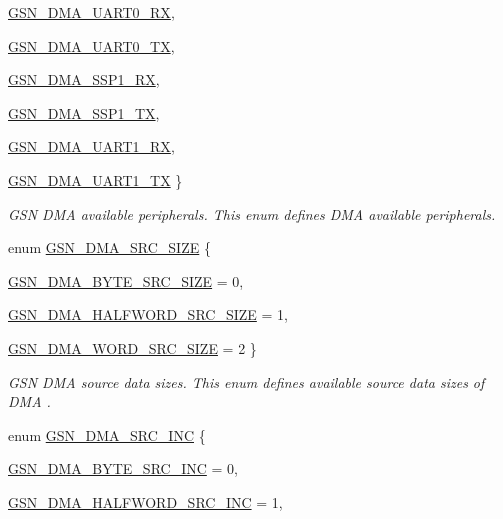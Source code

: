 \begin{DoxyCompactItemize}
\hyperlink{a00645_gga6b06d19717ade6dfd815a84e83d2388ca468b318f813ebdf54dbdf450f16a5732}{GSN\_\-DMA\_\-UART0\_\-RX}, 
\par
\hyperlink{a00645_gga6b06d19717ade6dfd815a84e83d2388caa4f202e8206de2d1ebfad1ad912bcd8d}{GSN\_\-DMA\_\-UART0\_\-TX}, 
\par
\hyperlink{a00645_gga6b06d19717ade6dfd815a84e83d2388ca328799f2ecf2b7883c1d7e4fce9664b7}{GSN\_\-DMA\_\-SSP1\_\-RX}, 
\par
\hyperlink{a00645_gga6b06d19717ade6dfd815a84e83d2388ca4f93148490d2139f20dfd6d88405f15d}{GSN\_\-DMA\_\-SSP1\_\-TX}, 
\par
\hyperlink{a00645_gga6b06d19717ade6dfd815a84e83d2388ca3066765ac1cd87c8ef4d029be6e620e6}{GSN\_\-DMA\_\-UART1\_\-RX}, 
\par
\hyperlink{a00645_gga6b06d19717ade6dfd815a84e83d2388ca9a3ace920959df147a2c3d35dcaa3013}{GSN\_\-DMA\_\-UART1\_\-TX}
 \}
\begin{DoxyCompactList}\small\item\em GSN DMA available peripherals. This enum defines DMA available peripherals. \end{DoxyCompactList}\item 
enum \hyperlink{a00645_ga5ae8eaac9f901eb2607d04c46b8141e9}{GSN\_\-DMA\_\-SRC\_\-SIZE} \{ \par
\hyperlink{a00645_gga5ae8eaac9f901eb2607d04c46b8141e9a2b2932e85c3b4fc18d56c38f39d31dd8}{GSN\_\-DMA\_\-BYTE\_\-SRC\_\-SIZE} =  0, 
\par
\hyperlink{a00645_gga5ae8eaac9f901eb2607d04c46b8141e9acb13c0f2739cfa4759bb75be01f0c5d6}{GSN\_\-DMA\_\-HALFWORD\_\-SRC\_\-SIZE} =  1, 
\par
\hyperlink{a00645_gga5ae8eaac9f901eb2607d04c46b8141e9a881ac284185eaa1f1eb431452ce9bbe5}{GSN\_\-DMA\_\-WORD\_\-SRC\_\-SIZE} =  2
 \}
\begin{DoxyCompactList}\small\item\em GSN DMA source data sizes. This enum defines available source data sizes of DMA . \end{DoxyCompactList}\item 
enum \hyperlink{a00645_ga592093c11bfd36ebbe08e1446e26f37a}{GSN\_\-DMA\_\-SRC\_\-INC} \{ \par
\hyperlink{a00645_gga592093c11bfd36ebbe08e1446e26f37aa33e61f45484d1c2ae0d2c8ad6a520b0b}{GSN\_\-DMA\_\-BYTE\_\-SRC\_\-INC} =  0, 
\par
\hyperlink{a00645_gga592093c11bfd36ebbe08e1446e26f37aa0fb26d608d6f3abb56aa50dc5e3588ab}{GSN\_\-DMA\_\-HALFWORD\_\-SRC\_\-INC} =  1, 
\par

\end{DoxyCompactItemize}
